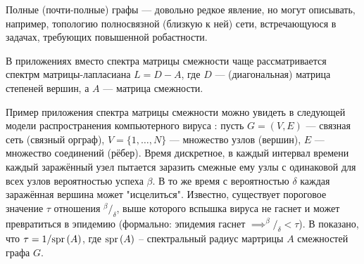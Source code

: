 Полные (почти-полные) графы --- довольно редкое явление,
но могут описывать, например, топологию полносвязной (близкую к ней) сети,
встречающуюся в задачах, требующих повышенной робастности.

В приложениях вместо спектра матрицы смежности чаще рассматривается
спектрм матрицы-лапласиана \( L = D - A \),
где \( D \) --- (диагональная) матрица степеней вершин,
а \( A \) --- матрица смежности.

Пример приложения спектра матрицы смежности можно увидеть
в следующей модели распространения компьютерного вируса \cite{epidemic-eigenvalues}:
пусть \( G = (V, E) \) --- связная сеть (связный орграф),
\( V = \{1, \ldots, N\} \) --- множество узлов (вершин),
\( E \) --- множество соединений (рёбер).
Время дискретное, в каждый интервал времени каждый заражённый узел
пытается заразить смежные ему узлы с одинаковой для всех узлов вероятностью успеха \( \beta \).
В то же время с вероятностью \( \delta \) каждая заражённая вершина может "исцелиться".
Известно, существует пороговое значение \( \tau \) отношения \( {^\beta}/_{\delta} \),
выше которого вспышка вируса не гаснет и может превратиться в эпидемию
(формально: эпидемия гаснет \( \implies ^{\beta}/_{\delta} < \tau \)).
В \cite{epidemic-eigenvalues} показано, что \( \tau = 1/\mathrm{spr}\left({A}\right) \),
где \( \mathrm{spr}\left({A}\right) \) -- спектральный радиус мартрицы \( A \) смежностей графа \( G \).

